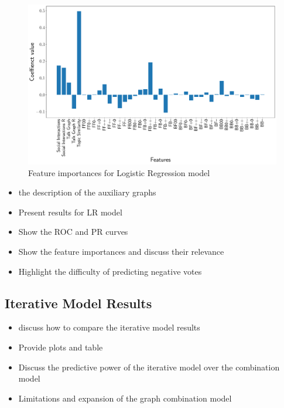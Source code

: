 \begin{figure}[htp]
    \centering
    \includegraphics[width=\textwidth]{images/Logistic Regression_features.pdf}
    \caption{Feature importances for Logistic Regression model }
    \label{fig:lr-feature-importances}
\end{figure}
\begin{itemize}
    \item the description of the auxiliary graphs 
    \item Present results for LR model
    \item Show the ROC and PR curves
    \item Show the feature importances and discuss their relevance 
    \item Highlight the difficulty of predicting negative votes
\end{itemize}

\subsection{Iterative Model Results}
\begin{itemize}
    \item discuss how to compare the iterative model results
    \item Provide plots and table 
    \item Discuss the predictive power of the iterative model over the combination model
    \item Limitations and expansion of the graph combination model
\end{itemize}

